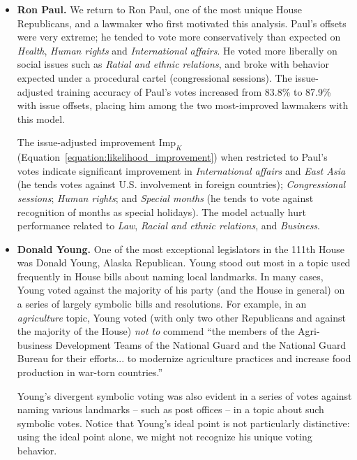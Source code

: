 \begin{itemize}
  \item \textbf{Ron Paul.}
We return to Ron Paul, one of the most unique House Republicans, and a
lawmaker who first motivated this analysis.  Paul's offsets were very
extreme; he tended to vote more conservatively than expected on
\emph{Health}, \emph{Human rights} and \emph{International affairs}.
He voted more liberally on social issues such as \emph{Ratial and
  ethnic relations}, and broke with behavior expected under a
procedural cartel (congressional sessions).
The issue-adjusted training accuracy of Paul's votes increased from
83.8\% to 87.9\% with issue offsets, placing him among the two
most-improved lawmakers with this model. %

The issue-adjusted improvement $\mbox{Imp}_K$
(Equation~\ref{equation:likelihood_improvement}) when restricted to
Paul's votes indicate significant improvement in \emph{International
  affairs} and \emph{East Asia} (he tends votes against
U.S. involvement in foreign countries); \emph{Congressional sessions};
\emph{Human rights}; and \emph{Special months} (he tends to vote
against recognition of months as special holidays).  The model
actually hurt performance related to \emph{Law}, \emph{Racial and
  ethnic relations}, and \emph{Business}.
\item \textbf{Donald Young.}
One of the most exceptional legislators in the 111th
House was Donald Young, Alaska Republican.  Young stood out most in a
topic used frequently in House bills about naming local landmarks. In
many cases, Young voted against the majority of his party (and the
House in general) on a series of largely symbolic bills and
resolutions.  For example, in an \emph{agriculture} topic, Young voted
(with only two other Republicans and against the majority of the
House) \emph{not to} commend ``the members of the Agri-business
Development Teams of the National Guard and the National Guard Bureau
for their efforts... to modernize agriculture practices and increase
food production in war-torn countries.'' %

Young's divergent symbolic voting was also evident in a series of
votes against naming various landmarks -- such as post offices -- in a
topic about such symbolic votes.  Notice that Young's ideal point is
not particularly distinctive: using the ideal point alone, we might
not recognize his unique voting behavior.
\end{itemize}


